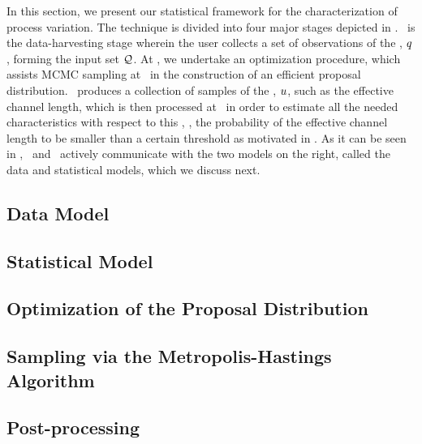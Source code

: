 
In this section, we present our statistical framework for the characterization of process variation.
The technique is divided into four major stages depicted in .
\ is the data-harvesting stage wherein the user collects a set of observations of the \qom, $q$, forming the input set $\mathcal{Q}$.
At , we undertake an optimization procedure, which assists MCMC sampling at \ in the construction of an efficient proposal distribution.
\ produces a collection of samples of the \qoi, $u$, such as the effective channel length, which is then processed at \ in order to estimate all the needed characteristics with respect to this \qoi, \eg, the probability of the effective channel length to be smaller than a certain threshold as motivated in .
As it can be seen in , \ and \ actively communicate with the two models on the right, called the data and statistical models, which we discuss next.

\subsection{Data Model} 


\subsection{Statistical Model} 


\subsection{Optimization of the Proposal Distribution} 


\subsection{Sampling via the Metropolis-Hastings Algorithm} 


\subsection{Post-processing} 

